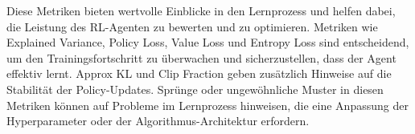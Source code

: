 Diese Metriken bieten wertvolle Einblicke in den Lernprozess und helfen dabei, die Leistung des \ac{RL}\hyp{}Agenten zu bewerten und zu optimieren.
Metriken wie Explained Variance, Policy Loss, Value Loss und Entropy Loss sind entscheidend, um den Trainingsfortschritt zu überwachen und sicherzustellen, dass der Agent effektiv lernt. Approx KL und Clip Fraction geben zusätzlich Hinweise auf die Stabilität der Policy\hyp{}Updates. Sprünge oder ungewöhnliche Muster in diesen Metriken können auf Probleme im Lernprozess hinweisen, die eine Anpassung der Hyperparameter oder der Algorithmus\hyp{}Architektur erfordern.




